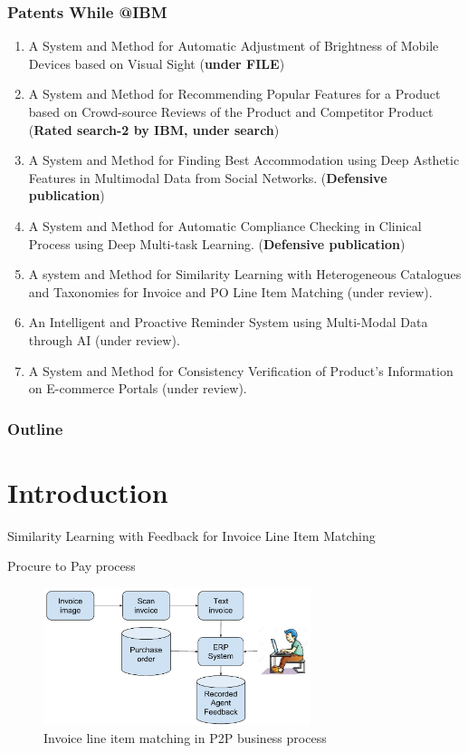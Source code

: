 \documentclass[blue]{beamer}
\begin{document}
\begin{frame}[shrink=20]
\footnotesize
\frametitle{Patents While @IBM}

\begin{enumerate} 
\item A System and Method for Automatic Adjustment of Brightness of Mobile Devices based on Visual Sight ({\bf under FILE})

\item A System and Method for Recommending Popular Features for a Product based on Crowd-source Reviews of the Product and Competitor Product  ({\bf Rated search-2 by IBM, under search}) 


\item A System and Method for Finding Best Accommodation using Deep Asthetic Features in Multimodal Data from Social Networks. ({\bf Defensive publication})

\item A System and Method for Automatic  Compliance Checking in Clinical Process using Deep Multi-task Learning. ({\bf  Defensive publication})

\item A system and Method for Similarity Learning with Heterogeneous Catalogues and Taxonomies for Invoice and PO Line Item Matching (under review).
\item  An Intelligent and Proactive Reminder System using Multi-Modal Data through AI (under review).

\item 
A System and Method for Consistency Verification of Product’s Information on E-commerce Portals (under review).
\end{enumerate}
\end{frame}

\begin{frame}
\frametitle{Outline}
  \tableofcontents %
\end{frame}
\section{Introduction}

\begin{frame}{Similarity Learning with Feedback for Invoice Line Item Matching}

\begin{block}{Procure to Pay process}
\begin{figure}
\centering
\includegraphics[height=4cm]{sdm_p2p.pdf}
\caption{Invoice line item matching in P2P business process}
\label{fig:invoice}
\end{figure}

\end{block}
\end{frame}
\end{document}
